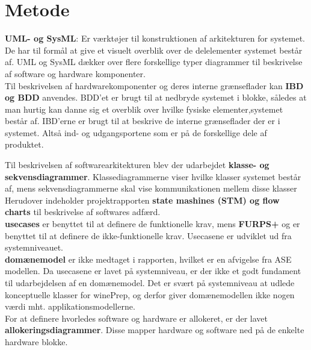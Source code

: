 \section{Metode}

\textbf{UML- og SysML}: Er værktøjer til konstruktionen af arkitekturen for systemet. De har til formål at give et visuelt overblik over de delelementer 
systemet består af. UML og SysML dækker over flere forskellige typer diagrammer til beskrivelse af software og hardware komponenter. \\ 

Til beskrivelsen af hardwarekomponenter og deres interne grænseflader kan \textbf {IBD og BDD} anvendes. BDD’et er brugt til at nedbryde systemet i blokke, 
således at man hurtig kan danne sig et overblik over hvilke fysiske elementer,systemet består af. IBD’erne er brugt til at beskrive de interne grænseflader der 
er i systemet. Altså ind- og udgangsportene som er på de forskellige dele af produktet.

Til beskrivelsen af softwarearkitekturen blev der udarbejdet \textbf{klasse- og sekvensdiagrammer}. Klassediagrammerne viser hvilke klasser systemet 
består af, mens sekvensdiagrammerne skal vise kommunikationen mellem disse klasser \\

Herudover indeholder projektrapporten \textbf{state mashines (STM) og flow charts} til beskrivelse af softwares adfærd.\\

\textbf{usecases}  er benyttet til at definere de funktionelle krav, mens \textbf{FURPS+} og  er benyttet til at definere de 
ikke-funktionelle krav. Usecasene er udviklet ud fra systemniveauet.\\

\textbf{domænemodel} er ikke medtaget i rapporten, hvilket er en afvigelse fra ASE modellen. Da usecasene er lavet på systemniveau, er der ikke et godt 
fundament til udarbejdelsen af en domænemodel. Det er svært på systemniveau at udlede konceptuelle klasser for winePrep, og derfor giver domænemodellen ikke 
nogen værdi mht. applikationsmodellerne.\\
 
For at definere hvorledes software og hardware er allokeret, er der lavet \textbf{allokeringsdiagrammer}. Disse mapper hardware og software ned på de enkelte
hardware blokke.\\
